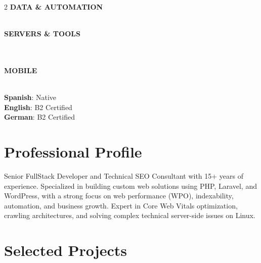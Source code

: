 \documentclass[10pt,a4paper]{article}
\begin{document}
\begin{paracol}{2}
\vspace{0.4em}
\textbf{\color{primary}\footnotesize DATA \& AUTOMATION} \\
  \\
 

\vspace{0.4em}
\textbf{\color{primary}\footnotesize SERVERS \& TOOLS} \\
   \\
   \\
  

\vspace{0.4em}
\textbf{\color{primary}\footnotesize MOBILE} \\
   \\
 

\textbf{Spanish}: Native \\
\textbf{English}: B2 Certified \\
\textbf{German}: B2 Certified

\switchcolumn


\section{Professional Profile}
Senior FullStack Developer and Technical SEO Consultant with 15+ years of experience. Specialized in building custom web solutions using PHP, Laravel, and WordPress, with a strong focus on web performance (WPO), indexability, automation, and business growth. Expert in Core Web Vitals optimization, crawling architectures, and solving complex technical server-side issues on Linux.

\section{Selected Projects}



\end{paracol}
\end{document}
